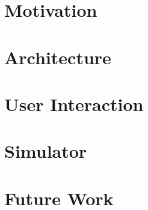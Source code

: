 \documentclass{bioinfo}
\begin{document}
\section{Motivation}


\section{Architecture}


\section{User Interaction}


\section{Simulator}


\section{Future Work}




\end{document}

